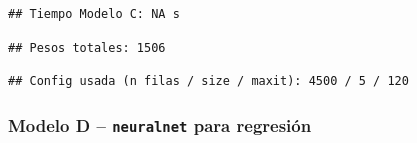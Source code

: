 \documentclass[
]{article}
\newenvironment{Shaded}{\begin{snugshade}}{\end{snugshade}}
\newcommand{\ControlFlowTok}[1]{\textcolor[rgb]{0.13,0.29,0.53}{\textbf{#1}}}
\newcommand{\FunctionTok}[1]{\textcolor[rgb]{0.13,0.29,0.53}{\textbf{#1}}}
\newcommand{\NormalTok}[1]{#1}
\newcommand{\SpecialCharTok}[1]{\textcolor[rgb]{0.81,0.36,0.00}{\textbf{#1}}}
\newcommand{\StringTok}[1]{\textcolor[rgb]{0.31,0.60,0.02}{#1}}
\begin{document}
\begin{verbatim}
## Tiempo Modelo C: NA s
\end{verbatim}

\begin{Shaded}
\end{Shaded}

\begin{verbatim}
## Pesos totales: 1506
\end{verbatim}

\begin{Shaded}
\end{Shaded}

\begin{verbatim}
## Config usada (n filas / size / maxit): 4500 / 5 / 120
\end{verbatim}

\hypertarget{modelo-d-neuralnet-para-regresiuxf3n}{%
\subsubsection{\texorpdfstring{Modelo D -- \texttt{neuralnet} para
regresión}{Modelo D -- neuralnet para regresión}}\label{modelo-d-neuralnet-para-regresiuxf3n}}
\end{document}
